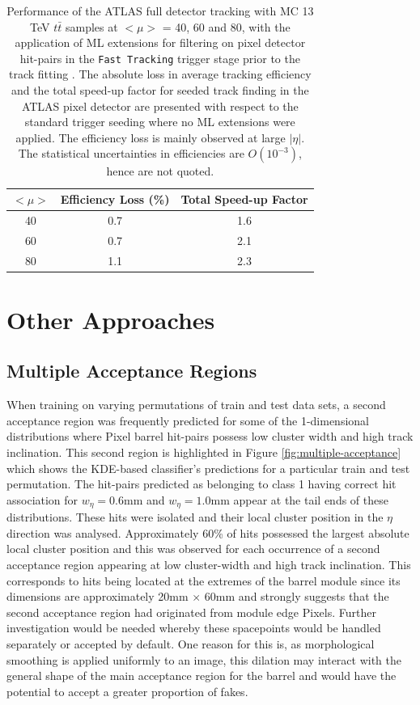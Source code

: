 \begin{table}[!htbp]
\caption{Performance of the ATLAS full detector tracking with MC 13 TeV $t\bar{t}$ samples at $<\mu>$ = 40, 60 and 80, with the application of ML extensions for filtering on pixel detector hit-pairs in the \texttt{Fast Tracking} trigger stage prior to the track fitting \cite{public-hlt}. The absolute loss in average tracking efficiency and the total speed-up factor for seeded track finding in the ATLAS pixel detector are presented with respect to the standard trigger seeding where no ML extensions were applied. The efficiency loss is mainly observed at large $|\eta|$. The statistical uncertainties in efficiencies are $O(10^{-3})$, hence are not quoted.}
\begin{center}
\begin{tabular}{ccc}
\toprule
$<\mu>$ & Efficiency Loss (\%) & Total Speed-up Factor  \\
\hline
40 & 0.7 & 1.6 \\
60 & 0.7 & 2.1 \\
80 & 1.1 & 2.3 \\
\bottomrule
\end{tabular}
\end{center}
\label{tab:pileup}
\end{table}


\section{Other Approaches}
\subsection{Multiple Acceptance Regions}

When training on varying permutations of train and test data sets, a second acceptance region was frequently predicted for some of the 1-dimensional distributions where Pixel barrel hit-pairs possess low cluster width and high track inclination. This second region is highlighted in Figure \ref{fig:multiple-acceptance} which shows the KDE-based classifier's predictions for a particular train and test permutation. The hit-pairs predicted as belonging to class 1 having correct hit association for $w_{\eta} = 0.6$mm and $w_{\eta} = 1.0$mm appear at the tail ends of these distributions. These hits were isolated and their local cluster position in the $\eta$ direction was analysed. Approximately 60\% of hits possessed the largest absolute local cluster position and this was observed for each occurrence of a second acceptance region appearing at low cluster-width and high track inclination. This corresponds to hits being located at the extremes of the barrel module since its dimensions are approximately 20mm $\times$ 60mm \cite{pixel-module-dimensions} and strongly suggests that the second acceptance region had originated from module edge Pixels. Further investigation would be needed whereby these spacepoints would be handled separately or accepted by default. One reason for this is, as morphological smoothing is applied uniformly to an image, this dilation may interact with the general shape of the main acceptance region for the barrel and would have the potential to accept a greater proportion of fakes.

